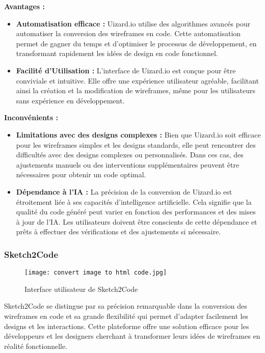 \textbf{Avantages :}
\begin{itemize}
    \item \textbf{Automatisation efficace :} Uizard.io utilise des algorithmes avancés pour automatiser la conversion des wireframes en code. Cette automatisation permet de gagner du temps et d'optimiser le processus de développement, en transformant rapidement les idées de design en code fonctionnel.

    \item \textbf{Facilité d'Utilisation :} L'interface de Uizard.io est conçue pour être conviviale et intuitive. Elle offre une expérience utilisateur agréable, facilitant ainsi la création et la modification de wireframes, même pour les utilisateurs sans expérience en développement.
\end{itemize}

\textbf{Inconvénients :}
\begin{itemize}
    \item \textbf{Limitations avec des designs complexes :} Bien que Uizard.io soit efficace pour les wireframes simples et les designs standards, elle peut rencontrer des difficultés avec des designs complexes ou personnalisés. Dans ces cas, des ajustements manuels ou des interventions supplémentaires peuvent être nécessaires pour obtenir un code optimal.

    \item \textbf{Dépendance à l'IA :} La précision de la conversion de Uizard.io est étroitement liée à ses capacités d'intelligence artificielle. Cela signifie que la qualité du code généré peut varier en fonction des performances et des mises à jour de l'IA. Les utilisateurs doivent être conscients de cette dépendance et prêts à effectuer des vérifications et des ajustements si nécessaire.
\end{itemize}


\subsubsection{Sketch2Code}
\begin{figure}[h]
    \centering
    \texttt{[image: convert image to html code.jpg]}
    \caption{Interface utilisateur de Sketch2Code}
    \label{fig:sketch2code_interface}
\end{figure}
Sketch2Code se distingue par sa précision remarquable dans la conversion des wireframes en code et sa grande flexibilité qui permet d'adapter facilement les designs et les interactions. Cette plateforme offre une solution efficace pour les développeurs et les designers cherchant à transformer leurs idées de wireframes en réalité fonctionnelle.

